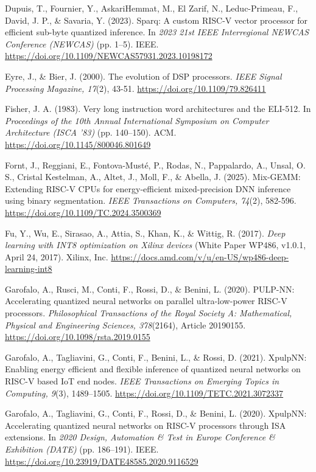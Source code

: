 \begin{apareferences}
Dupuis, T., Fournier, Y., AskariHemmat, M., El Zarif, N., Leduc-Primeau, F., David, J. P., \& Savaria, Y. (2023). Sparq: A custom RISC-V vector processor for efficient sub-byte quantized inference. In \emph{2023 21st IEEE Interregional NEWCAS Conference (NEWCAS)} (pp. 1–5). IEEE. \url{https://doi.org/10.1109/NEWCAS57931.2023.10198172}

Eyre, J., \& Bier, J. (2000). The evolution of DSP processors. \emph{IEEE Signal Processing Magazine, 17}(2), 43-51. \url{https://doi.org/10.1109/79.826411}

Fisher, J. A. (1983). Very long instruction word architectures and the ELI-512. In \emph{Proceedings of the 10th Annual International Symposium on Computer Architecture (ISCA '83)} (pp. 140–150). ACM. \url{https://doi.org/10.1145/800046.801649}

Fornt, J., Reggiani, E., Fontova-Musté, P., Rodas, N., Pappalardo, A., Unsal, O. S., Cristal Kestelman, A., Altet, J., Moll, F., \& Abella, J. (2025). Mix-GEMM: Extending RISC-V CPUs for energy-efficient mixed-precision DNN inference using binary segmentation. \emph{IEEE Transactions on Computers, 74}(2), 582-596. \url{https://doi.org/10.1109/TC.2024.3500369}

Fu, Y., Wu, E., Sirasao, A., Attia, S., Khan, K., \& Wittig, R. (2017). \emph{Deep learning with INT8 optimization on Xilinx devices} (White Paper WP486, v1.0.1, April 24, 2017). Xilinx, Inc. \url{https://docs.amd.com/v/u/en-US/wp486-deep-learning-int8}

Garofalo, A., Rusci, M., Conti, F., Rossi, D., \& Benini, L. (2020). PULP-NN: Accelerating quantized neural networks on parallel ultra-low-power RISC-V processors. \emph{Philosophical Transactions of the Royal Society A: Mathematical, Physical and Engineering Sciences, 378}(2164), Article 20190155. \url{https://doi.org/10.1098/rsta.2019.0155}

Garofalo, A., Tagliavini, G., Conti, F., Benini, L., \& Rossi, D. (2021). XpulpNN: Enabling energy efficient and flexible inference of quantized neural networks on RISC-V based IoT end nodes. \emph{IEEE Transactions on Emerging Topics in Computing, 9}(3), 1489–1505. \url{https://doi.org/10.1109/TETC.2021.3072337}

Garofalo, A., Tagliavini, G., Conti, F., Rossi, D., \& Benini, L. (2020). XpulpNN: Accelerating quantized neural networks on RISC-V processors through ISA extensions. In \emph{2020 Design, Automation \& Test in Europe Conference \& Exhibition (DATE)} (pp. 186–191). IEEE. \url{https://doi.org/10.23919/DATE48585.2020.9116529}


\end{apareferences}
